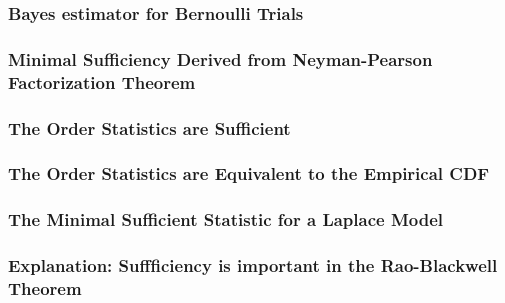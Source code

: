 		\subsubsection{Bayes estimator for Bernoulli Trials}

		\subsubsection{Minimal Sufficiency Derived from Neyman-Pearson Factorization Theorem}

		\subsubsection{The Order Statistics are Sufficient}

		\subsubsection{The Order Statistics are Equivalent to the Empirical CDF}

		\subsubsection{The Minimal Sufficient Statistic for a Laplace Model}

		\subsubsection{Explanation: Suffficiency is important in the Rao-Blackwell Theorem}